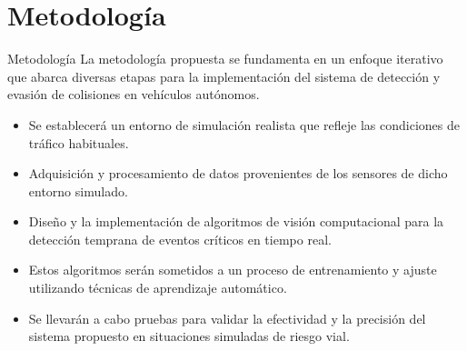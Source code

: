 \documentclass[8pt]{beamer}
\begin{document}
    \section{Metodología}
    \begin{frame}{Metodología}
        La metodología propuesta se fundamenta en un enfoque iterativo que abarca diversas etapas para la implementación del sistema de detección
        y evasión de colisiones en vehículos autónomos.
        \begin{itemize}

            \item Se establecerá un entorno de simulación realista que refleje las condiciones de tráfico habituales.
            \item Adquisición y procesamiento de datos provenientes de los sensores de dicho entorno simulado.
            \item Diseño y la implementación de algoritmos de visión computacional para la detección temprana de eventos críticos en tiempo real.
            \item Estos algoritmos serán sometidos a un proceso de entrenamiento y ajuste utilizando técnicas de aprendizaje automático.
            \item Se llevarán a cabo pruebas para validar la efectividad y la precisión del sistema propuesto en situaciones simuladas de riesgo vial.
        \end{itemize}
    \end{frame}
\end{document}
